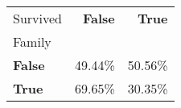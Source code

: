 \begin{tabular}{lrr}
\toprule
Survived & \textbf{False} & \textbf{True} \\
Family &  &  \\
\midrule
\textbf{False} & 49.44\% & 50.56\% \\
\textbf{True} & 69.65\% & 30.35\% \\
\bottomrule
\end{tabular}

